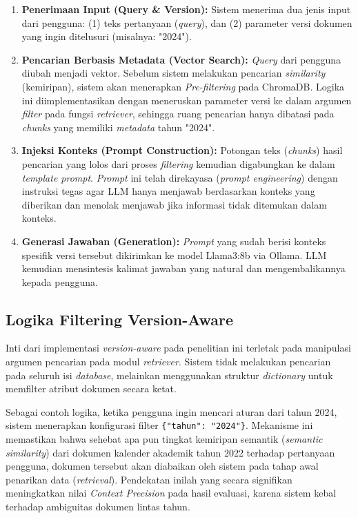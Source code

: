 \begin{enumerate}
    \item \textbf{Penerimaan Input (Query \& Version):} Sistem menerima dua jenis input dari pengguna: (1) teks pertanyaan (\textit{query}), dan (2) parameter versi dokumen yang ingin ditelusuri (misalnya: "2024").
    
    \item \textbf{Pencarian Berbasis Metadata (Vector Search):} \textit{Query} dari pengguna diubah menjadi vektor. Sebelum sistem melakukan pencarian \textit{similarity} (kemiripan), sistem akan menerapkan \textit{Pre-filtering} pada ChromaDB. Logika ini diimplementasikan dengan meneruskan parameter versi ke dalam argumen \textit{filter} pada fungsi \textit{retriever}, sehingga ruang pencarian hanya dibatasi pada \textit{chunks} yang memiliki \textit{metadata} tahun "2024".
    
    \item \textbf{Injeksi Konteks (Prompt Construction):} Potongan teks (\textit{chunks}) hasil pencarian yang lolos dari proses \textit{filtering} kemudian digabungkan ke dalam \textit{template prompt}. \textit{Prompt} ini telah direkayasa (\textit{prompt engineering}) dengan instruksi tegas agar LLM hanya menjawab berdasarkan konteks yang diberikan dan menolak menjawab jika informasi tidak ditemukan dalam konteks.
    
    \item \textbf{Generasi Jawaban (Generation):} \textit{Prompt} yang sudah berisi konteks spesifik versi tersebut dikirimkan ke model Llama3:8b via Ollama. LLM kemudian mensintesis kalimat jawaban yang natural dan mengembalikannya kepada pengguna.
\end{enumerate}

\subsection{Logika Filtering Version-Aware}

Inti dari implementasi \textit{version-aware} pada penelitian ini terletak pada manipulasi argumen pencarian pada modul \textit{retriever}. Sistem tidak melakukan pencarian pada seluruh isi \textit{database}, melainkan menggunakan struktur \textit{dictionary} untuk memfilter atribut dokumen secara ketat.

Sebagai contoh logika, ketika pengguna ingin mencari aturan dari tahun 2024, sistem menerapkan konfigurasi filter \texttt{\{"tahun": "2024"\}}. Mekanisme ini memastikan bahwa sehebat apa pun tingkat kemiripan semantik (\textit{semantic similarity}) dari dokumen kalender akademik tahun 2022 terhadap pertanyaan pengguna, dokumen tersebut akan diabaikan oleh sistem pada tahap awal penarikan data (\textit{retrieval}). Pendekatan inilah yang secara signifikan meningkatkan nilai \textit{Context Precision} pada hasil evaluasi, karena sistem kebal terhadap ambiguitas dokumen lintas tahun.